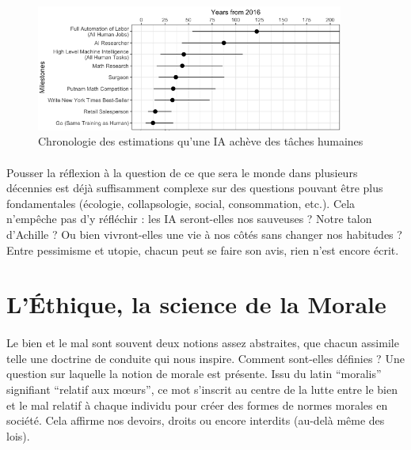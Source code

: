 \documentclass[10pt, french, a4paper]{report}
\begin{document}
\begin{figure}[hbt!]
    \centering
    \includegraphics[width=0.9\textwidth]{images/grace_2017_chrono_estim_ia.png}
    \caption{Chronologie des estimations qu’une IA achève des tâches humaines \citep{grace_when_2017}}
    \label{fig:chrono_estim_ia}
\end{figure}

\paragraph{}
Pousser la réflexion à la question de ce que sera le monde dans plusieurs décennies est déjà suffisamment complexe sur des questions pouvant être plus fondamentales (écologie, collapsologie, social, consommation, etc.). Cela n’empêche pas d’y réfléchir : les IA seront-elles nos sauveuses ? Notre talon d’Achille ? Ou bien vivront-elles une vie à nos côtés sans changer nos habitudes ? Entre pessimisme et utopie, chacun peut se faire son avis, rien n’est encore écrit.



\section{L'\uppercase{é}thique, la science de la Morale}
\label{sec:ethique}

\paragraph{}
Le bien et le mal sont souvent deux notions assez abstraites, que chacun assimile telle une doctrine de conduite qui nous inspire. Comment sont-elles définies ? Une question sur laquelle la notion de morale est présente. Issu du latin ``moralis'' signifiant ``relatif aux mœurs'', ce mot s’inscrit au centre de la lutte entre le bien et le mal relatif à chaque individu pour créer des formes de normes morales en société. Cela affirme nos devoirs, droits ou encore interdits (au-delà même des lois).
\end{document}
